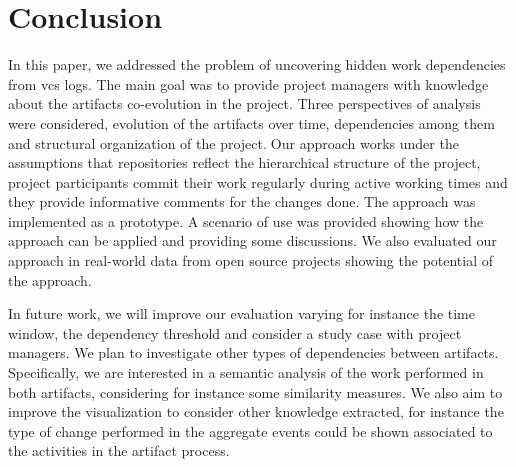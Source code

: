 \section{Conclusion}
\label{sec:bpm2017conclusion}

In this paper, we addressed the problem of uncovering hidden work dependencies from \gls{vcs} logs. The main goal was to provide project managers with knowledge about the artifacts co-evolution in the project. Three perspectives of analysis were considered, evolution of the artifacts over time, dependencies among them and structural organization of the project.Our approach works under the assumptions that repositories reflect the hierarchical structure of the project, project participants commit their work regularly during active working
times and they provide informative comments for the changes done. The approach was implemented as a prototype. A scenario of use was provided showing how the approach can be applied and providing some discussions. We also evaluated our approach in real-world data from open source projects showing the potential of the approach.

In future work, we will improve our evaluation varying for instance the time window, the dependency threshold and consider a study case with project managers. We plan to investigate other types of dependencies between artifacts. Specifically, we are interested in a semantic analysis of the work performed in both artifacts, considering for instance some similarity measures. We also aim to improve the visualization to consider other knowledge extracted, for instance the type of change performed in the aggregate events could be shown associated to the activities in the artifact process.
